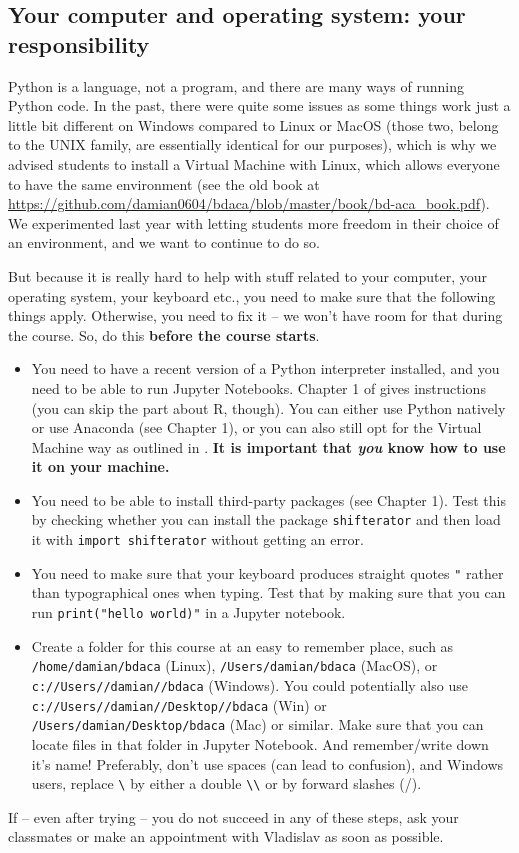 \documentclass[a4paper,10pt,twocolumn]{report}
\newenvironment{corona}{%
	\begin{shaded*}%
	}{%
	\end{shaded*}%
}
\begin{document}
\begin{corona}
\section{Your computer and operating system: your responsibility}	
Python is a language, not a program, and there are many ways of running Python code. In the past, there were quite some issues as some things work just a little bit different on Windows compared to Linux or MacOS (those two, belong to the UNIX family, are essentially identical for our purposes), which is why we advised students to install a Virtual Machine with Linux, which allows everyone to have the same environment (see the old book at \url{https://github.com/damian0604/bdaca/blob/master/book/bd-aca_book.pdf}). We experimented last year with letting students more freedom in their choice of an environment, and we want to continue to do so.

But because it is really hard to help with stuff related to your computer, your operating system, your keyboard etc., you need to make sure that the following things apply. Otherwise, you need to fix it -- we won't have room for that during the course. So, do this \textbf{before the course starts}.

\begin{itemize}
	\item You need to have a recent version of a Python interpreter installed, and you need to be able to run Jupyter Notebooks. Chapter 1 of \cite{cssbook} gives instructions (you can skip the part about R, though). You can either use Python natively or use Anaconda (see Chapter 1), or you can also still opt for the Virtual Machine way as outlined in \cite{Trilling2016}. \textbf{It is important that \emph{you} know how to use it on your machine.}
	\item You need to be able to install third-party packages (see Chapter 1). Test this by checking whether you can install the package \texttt{shifterator} and then load it with \texttt{import shifterator} without getting an error.
	\item You need to make sure that your keyboard produces straight quotes \texttt{"} rather than typographical ones when typing. Test that by making sure that you can run \texttt{print("hello world)"} in a Jupyter notebook.
	\item Create a folder for this course at an easy to remember place, such as \texttt{/home/damian/bdaca} (Linux), \texttt{/Users/damian/bdaca} (MacOS), or \texttt{c://Users//damian//bdaca} (Windows). You could potentially also use \texttt{c://Users//damian//Desktop//bdaca} (Win) or \texttt{/Users/damian/Desktop/bdaca} (Mac) or similar. Make sure that you can locate files in that folder in Jupyter Notebook. And remember/write down it's name! Preferably, don't use spaces (can lead to confusion), and Windows users, replace \texttt{\textbackslash} by either a double \texttt{\textbackslash \textbackslash} or by forward slashes (/).
\end{itemize}
If -- even after trying -- you do not succeed in any of these steps, ask your classmates or make an appointment with Vladislav as soon as possible.


\end{corona}
\end{document}
